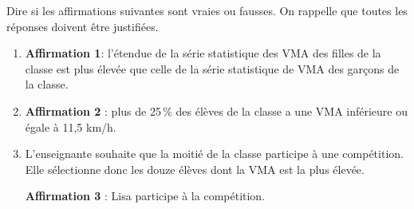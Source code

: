 \begin{enumerate}
Dire si les affirmations suivantes sont vraies ou fausses. On rappelle que toutes les réponses
doivent être justifiées.

	\begin{enumerate}
		\item \textbf{Affirmation 1}: l'étendue de la série statistique des VMA des filles de la classe est plus élevée que celle de la série statistique de VMA des garçons de la classe.
		\item \textbf{Affirmation 2} : plus de 25\,\% des élèves de la classe a une VMA inférieure ou égale à 11,5 km/h.
		\item L'enseignante souhaite que la moitié de la classe participe à une compétition. Elle sélectionne donc les douze élèves dont la VMA est la plus élevée.

\textbf{Affirmation 3} : Lisa participe à la compétition.
	\end{enumerate}
\end{enumerate}

\bigskip

